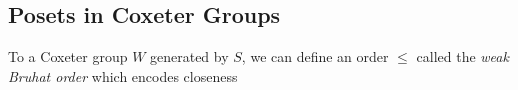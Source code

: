 \documentclass[class=article, crop=false]{standalone}
\begin{document}
\subsection{Posets in Coxeter Groups}
To a Coxeter group $W$ generated by $S$, we can define an order $\leq$ called the \emph{weak Bruhat order} which encodes closeness 

	
\end{document}

